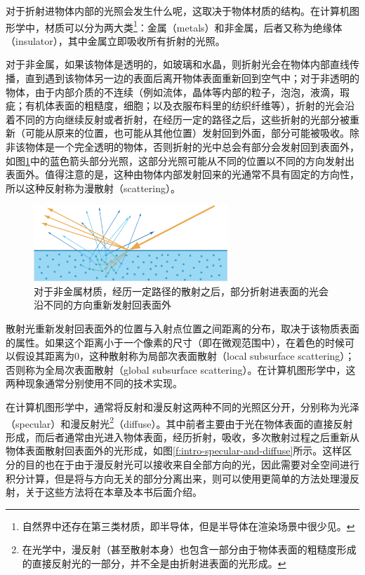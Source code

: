 对于折射进物体内部的光照会发生什么呢，这取决于物体材质的结构。在计算机图形学中，材质可以分为两大类\footnote{自然界中还存在第三类材质，即半导体，但是半导体在渲染场景中很少见。}：金属（metals）和非金属，后者又称为绝缘体（insulator），其中金属立即吸收所有折射的光照。

对于非金属，如果该物体是透明的，如玻璃和水晶，则折射光会在物体内部直线传播，直到遇到该物体另一边的表面后离开物体表面重新回到空气中；对于非透明的物体，由于内部介质的不连续（例如流体，晶体等内部的粒子，泡泡，液滴，瑕疵；有机体表面的粗糙度，细胞；以及衣服布料里的纺织纤维等），折射的光会沿着不同的方向继续反射或者折射，在经历一定的路径之后，这些折射的光部分被重新（可能从原来的位置，也可能从其他位置）发射回到外面，部分可能被吸收。除非该物体是一个完全透明的物体，否则折射的光中总会有部分会发射回到表面外，如图\ref{f:intro-refraction}中的蓝色箭头部分光照，这部分光照可能从不同的位置以不同的方向发射出表面外。值得注意的是，这种由物体内部发射回来的光通常不具有固定的方向性，所以这种反射称为漫散射（scattering）。

\begin{figure}
\sidecaption
	\includegraphics[width=0.65\textwidth]{figures/intro/ray-optics-5}
	\caption{对于非金属材质，经历一定路径的散射之后，部分折射进表面的光会沿不同的方向重新发射回表面外}
	\label{f:intro-refraction} 
\end{figure}

散射光重新发射回表面外的位置与入射点位置之间距离的分布，取决于该物质表面的属性。如果这个距离小于一个像素的尺寸（即在微观范围中），在着色的时候可以假设其距离为$0$，这种散射称为局部次表面散射（local subsurface scattering）；否则称为全局次表面散射（global subsurface scattering）。在计算机图形学中，这两种现象通常分别使用不同的技术实现。

在计算机图形学中，通常将反射和漫反射这两种不同的光照区分开，分别称为光泽（specular）和漫反射光\footnote{在光学中，漫反射（甚至散射本身）也包含一部分由于物体表面的粗糙度形成的直接反射光的一部分，并不全是由折射进表面的光形成。}（diffuse）。其中前者主要由于光在物体表面的直接反射形成，而后者通常由光进入物体表面，经历折射，吸收，多次散射过程之后重新从物体表面散射回表面外的光形成，如图\ref{f:intro-specular-and-diffuse}所示。这样区分的目的也在于由于漫反射光可以接收来自全部方向的光，因此需要对全空间进行积分计算，但是将与方向无关的部分分离出来，则可以使用更简单的方法处理漫反射，关于这些方法将在本章及本书后面介绍。

